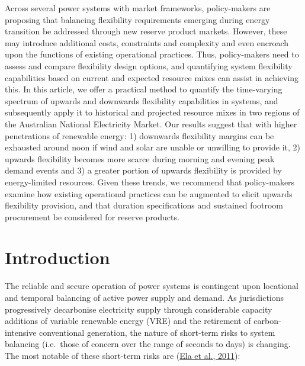 \documentclass[12pt,a4paper,]{report}
\begin{document}
Across several power systems with market frameworks, policy-makers are
proposing that balancing flexibility requirements emerging during energy
transition be addressed through new reserve product markets. However,
these may introduce additional costs, constraints and complexity and
even encroach upon the functions of existing operational practices.
Thus, policy-makers need to assess and compare flexibility design
options, and quantifying system flexibility capabilities based on
current and expected resource mixes can assist in achieving this. In
this article, we offer a practical method to quantify the time-varying
spectrum of upwards and downwards flexibility capabilities in systems,
and subsequently apply it to historical and projected resource mixes in
two regions of the Australian National Electricity Market. Our results
suggest that with higher penetrations of renewable energy: 1) downwards
flexibility margins can be exhausted around noon if wind and solar are
unable or unwilling to provide it, 2) upwards flexibility becomes more
scarce during morning and evening peak demand events and 3) a greater
portion of upwards flexibility is provided by energy-limited resources.
Given these trends, we recommend that policy-makers examine how existing
operational practices can be augmented to elicit upwards flexibility
provision, and that duration specifications and sustained footroom
procurement be considered for reserve products.

\hypertarget{sec:reserves-intro}{%
\section{Introduction}\label{sec:reserves-intro}}

The reliable and secure operation of power systems is contingent upon
locational and temporal balancing of active power supply and demand. As
jurisdictions progressively decarbonise electricity supply through
considerable capacity additions of variable renewable energy (VRE) and
the retirement of carbon-intensive conventional generation, the nature
of short-term risks to system balancing (i.e.~those of concern over the
range of seconds to days) is changing. The most notable of these
short-term risks are
(\protect\hyperlink{ref-elaOperatingReservesVariable2011}{Ela et al.,
2011}):
\end{document}
